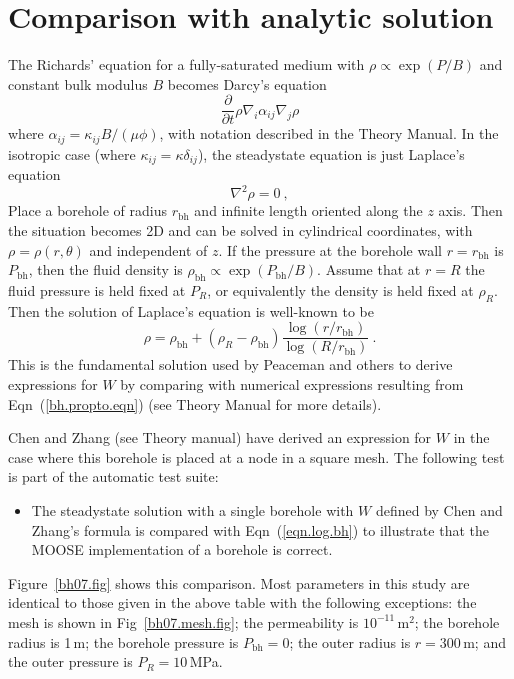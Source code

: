 \documentclass[]{scrreprt}
\begin{document}
\section{Comparison with analytic solution}
The Richards' equation for a fully-saturated medium with $\rho \propto
\exp(P/B)$ and constant bulk modulus $B$ becomes Darcy's equation
\begin{equation}
\frac{\partial}{\partial t}\rho \nabla_{i}\alpha_{ij}\nabla_{j}\rho
\end{equation}
where $\alpha_{ij} = \kappa_{ij}B/(\mu\phi)$, with notation described
in the Theory Manual.   In the isotropic case (where $\kappa_{ij} =
\kappa \delta_{ij}$), the steadystate equation is just Laplace's
equation
\begin{equation}
\nabla^{2}\rho = 0 \ ,
\end{equation}
Place a borehole of radius $r_{\mathrm{bh}}$ and infinite length
oriented along the $z$ axis.  Then the situation becomes 2D and can be
solved in cylindrical coordinates, with $\rho=\rho(r,\theta)$ and
independent of $z$.  If the pressure at the borehole wall
$r=r_{\mathrm{bh}}$ is $P_{\mathrm{bh}}$, then the fluid density is
$\rho_{\mathrm{bh}} \propto \exp(P_{\mathrm{bh}}/B)$.  Assume that at
$r=R$ the fluid pressure is held fixed at $P_{R}$, or equivalently the
density is held fixed at $\rho_{R}$.  Then the solution of Laplace's
equation is well-known to be
\begin{equation}
\rho = \rho_{\mathrm{bh}} + (\rho_{R} - \rho_{\mathrm{bh}})
\frac{\log(r/r_{\mathrm{bh}})}{\log(R/r_{\mathrm{bh}})} \ .
\label{eqn.log.bh}
\end{equation}
This is the fundamental solution used by Peaceman and others to derive
expressions for $W$ by comparing with numerical expressions resulting
from Eqn~(\ref{bh.propto.eqn}) (see Theory Manual for more details).

Chen and Zhang (see Theory manual) have derived an expression for $W$
in the case where this borehole is placed at a node in a square mesh.
The following test is part of the automatic test suite:
\begin{itemize}
\item The steadystate solution with a single borehole with $W$ defined by
Chen and Zhang's formula is compared with Eqn~(\ref{eqn.log.bh}) to
illustrate that the MOOSE implementation of a borehole is correct.
\end{itemize}
Figure~\ref{bh07.fig} shows this comparison.  Most parameters in this
study are identical to those given in the above table with the
following exceptions: the mesh is shown in Fig~\ref{bh07.mesh.fig};
the permeability is $10^{-11}$\,m$^{2}$; the borehole radius is 1\,m;
the borehole pressure is $P_{\mathrm{bh}}=0$; the outer radius is
$r=300$\,m; and the outer pressure is $P_{R}=10$\,MPa.
\end{document}
